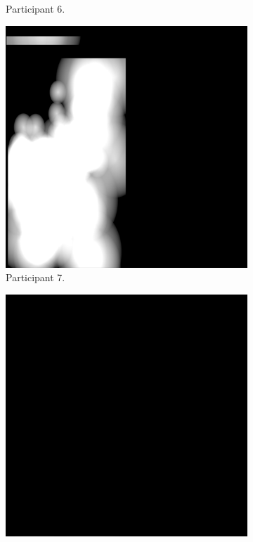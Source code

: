 \begin{figure}[!ht]
\begin{subfigure}[b]{0.24\textwidth}
        \caption{Participant 6.}
    \end{subfigure}
    \hfill    
    \begin{subfigure}[b]{0.24\textwidth}
        \centering
        \includegraphics[width=\textwidth]{img/data/Panel11/single/7.png}
        \caption{Participant 7.}
    \end{subfigure}
    \hfill    
    \begin{subfigure}[b]{0.24\textwidth}
        \centering
        \includegraphics[width=\textwidth]{img/data/Panel11/single/8.png}

\end{subfigure}
\end{figure}
